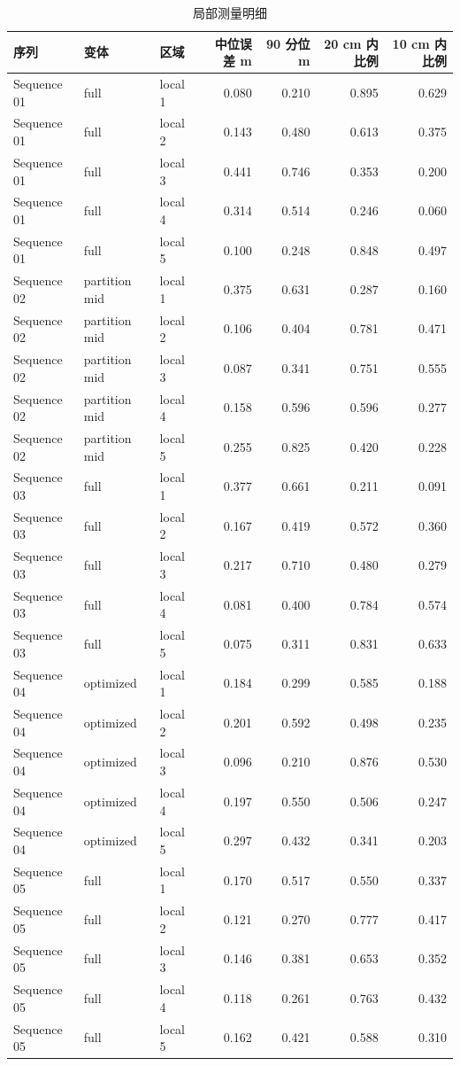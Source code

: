 \documentclass[UTF8,a4paper,11pt]{ctexart}
\begin{document}
{\setlength{\tabcolsep}{3pt}
\begin{table}[H]
\centering
\scriptsize
\caption{局部测量明细}
\label{tab:local_rows}
\begin{tabular}{lllrrrr}
\toprule
序列 & 变体 & 区域 & 中位误差 m & 90 分位 m & 20 cm 内比例 & 10 cm 内比例 \\
\midrule
Sequence 01 & full & local 1 & 0.080 & 0.210 & 0.895 & 0.629 \\
Sequence 01 & full & local 2 & 0.143 & 0.480 & 0.613 & 0.375 \\
Sequence 01 & full & local 3 & 0.441 & 0.746 & 0.353 & 0.200 \\
Sequence 01 & full & local 4 & 0.314 & 0.514 & 0.246 & 0.060 \\
Sequence 01 & full & local 5 & 0.100 & 0.248 & 0.848 & 0.497 \\
Sequence 02 & partition mid & local 1 & 0.375 & 0.631 & 0.287 & 0.160 \\
Sequence 02 & partition mid & local 2 & 0.106 & 0.404 & 0.781 & 0.471 \\
Sequence 02 & partition mid & local 3 & 0.087 & 0.341 & 0.751 & 0.555 \\
Sequence 02 & partition mid & local 4 & 0.158 & 0.596 & 0.596 & 0.277 \\
Sequence 02 & partition mid & local 5 & 0.255 & 0.825 & 0.420 & 0.228 \\
Sequence 03 & full & local 1 & 0.377 & 0.661 & 0.211 & 0.091 \\
Sequence 03 & full & local 2 & 0.167 & 0.419 & 0.572 & 0.360 \\
Sequence 03 & full & local 3 & 0.217 & 0.710 & 0.480 & 0.279 \\
Sequence 03 & full & local 4 & 0.081 & 0.400 & 0.784 & 0.574 \\
Sequence 03 & full & local 5 & 0.075 & 0.311 & 0.831 & 0.633 \\
Sequence 04 & optimized & local 1 & 0.184 & 0.299 & 0.585 & 0.188 \\
Sequence 04 & optimized & local 2 & 0.201 & 0.592 & 0.498 & 0.235 \\
Sequence 04 & optimized & local 3 & 0.096 & 0.210 & 0.876 & 0.530 \\
Sequence 04 & optimized & local 4 & 0.197 & 0.550 & 0.506 & 0.247 \\
Sequence 04 & optimized & local 5 & 0.297 & 0.432 & 0.341 & 0.203 \\
Sequence 05 & full & local 1 & 0.170 & 0.517 & 0.550 & 0.337 \\
Sequence 05 & full & local 2 & 0.121 & 0.270 & 0.777 & 0.417 \\
Sequence 05 & full & local 3 & 0.146 & 0.381 & 0.653 & 0.352 \\
Sequence 05 & full & local 4 & 0.118 & 0.261 & 0.763 & 0.432 \\
Sequence 05 & full & local 5 & 0.162 & 0.421 & 0.588 & 0.310 \\
\bottomrule
\end{tabular}
\end{table}
}
\end{document}
